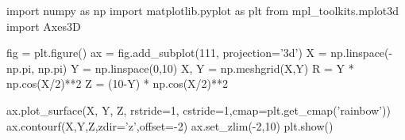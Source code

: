 \documentclass[11pt]{article}
\newenvironment{Shaded}{}{}
\newcommand{\DecValTok}[1]{\textcolor[rgb]{0.25,0.63,0.44}{{#1}}}
\newcommand{\StringTok}[1]{\textcolor[rgb]{0.25,0.44,0.63}{{#1}}}
\newcommand{\NormalTok}[1]{{#1}}
\newcommand{\ImportTok}[1]{{#1}}
\newcommand{\OperatorTok}[1]{\textcolor[rgb]{0.40,0.40,0.40}{{#1}}}
\begin{document}
\begin{Shaded}
\begin{Highlighting}[]
\ImportTok{import}\NormalTok{ numpy }\ImportTok{as}\NormalTok{ np  }
\ImportTok{import}\NormalTok{ matplotlib.pyplot }\ImportTok{as}\NormalTok{ plt  }
\ImportTok{from}\NormalTok{ mpl_toolkits.mplot3d }\ImportTok{import}\NormalTok{ Axes3D  }

\NormalTok{fig }\OperatorTok{=}\NormalTok{ plt.figure()   }
\NormalTok{ax }\OperatorTok{=}\NormalTok{ fig.add_subplot(}\DecValTok{111}\NormalTok{, projection}\OperatorTok{=}\StringTok{'3d'}\NormalTok{)   }
\NormalTok{X }\OperatorTok{=}\NormalTok{ np.linspace(}\OperatorTok{-}\NormalTok{np.pi, np.pi)  }
\NormalTok{Y }\OperatorTok{=}\NormalTok{ np.linspace(}\DecValTok{0}\NormalTok{,}\DecValTok{10}\NormalTok{)}
\NormalTok{X, Y }\OperatorTok{=}\NormalTok{ np.meshgrid(X,Y)  }
\NormalTok{R }\OperatorTok{=}\NormalTok{ Y }\OperatorTok{*}\NormalTok{ np.cos(X}\OperatorTok{/}\DecValTok{2}\NormalTok{)}\OperatorTok{**}\DecValTok{2}    
\NormalTok{Z }\OperatorTok{=}\NormalTok{ (}\DecValTok{10}\OperatorTok{-}\NormalTok{Y) }\OperatorTok{*}\NormalTok{ np.cos(X}\OperatorTok{/}\DecValTok{2}\NormalTok{)}\OperatorTok{**}\DecValTok{2} 

\NormalTok{ax.plot_surface(X, Y, Z, rstride}\OperatorTok{=}\DecValTok{1}\NormalTok{, cstride}\OperatorTok{=}\DecValTok{1}\NormalTok{,cmap}\OperatorTok{=}\NormalTok{plt.get_cmap(}\StringTok{'rainbow'}\NormalTok{))   }
\NormalTok{ax.contourf(X,Y,Z,zdir}\OperatorTok{=}\StringTok{'z'}\NormalTok{,offset}\OperatorTok{=-}\DecValTok{2}\NormalTok{)    }
\NormalTok{ax.set_zlim(}\OperatorTok{-}\DecValTok{2}\NormalTok{,}\DecValTok{10}\NormalTok{)}
\NormalTok{plt.show()}
\end{Highlighting}
\end{Shaded}
\end{document}
